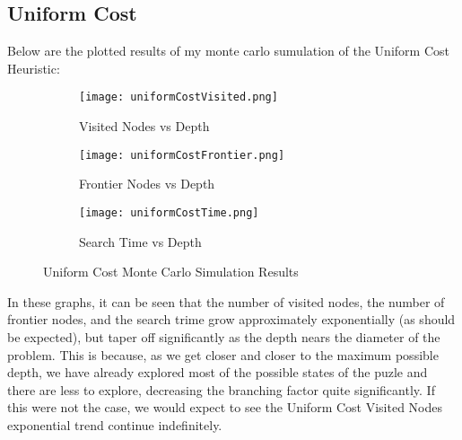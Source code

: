 \documentclass{article}
\begin{document}
\subsection{Uniform Cost}
Below are the plotted results of my monte carlo sumulation of the Uniform Cost Heuristic:
\begin{figure}[ht]
	\centering
	\begin{subfigure}[b]{0.32\textwidth}
		\centering
		\texttt{[image: uniformCostVisited.png]}
		\caption{Visited Nodes vs Depth}
		\label{fig:Uniform Cost Visited Nodes}
	\end{subfigure}
	\hfill
	\begin{subfigure}[b]{0.32\textwidth}
		\centering
		\texttt{[image: uniformCostFrontier.png]}
		\caption{Frontier Nodes vs Depth}
		\label{fig:Uniform Cost Frontier Nodes}
	\end{subfigure}
	\hfill
	\begin{subfigure}[b]{0.32\textwidth}
		\centering
		\texttt{[image: uniformCostTime.png]}
		\caption{Search Time vs Depth}
		\label{fig:Uniform Cost Search Time}
	\end{subfigure}
	\caption{Uniform Cost Monte Carlo Simulation Results}
	\label{fig:Uniform Cost Monte Carlo Simulation}
\end{figure}
\par In these graphs, it can be seen that the number of visited nodes, the number of frontier nodes, and the search trime grow approximately exponentially (as should be expected), but taper off significantly as the depth nears the diameter of the problem. This is because, as we get closer and closer to the maximum possible depth, we have already explored most of the possible states of the puzle and there are less to explore, decreasing the branching factor quite significantly. If this were not the case, we would expect to see the Uniform Cost Visited Nodes exponential trend continue indefinitely.
\end{document}
